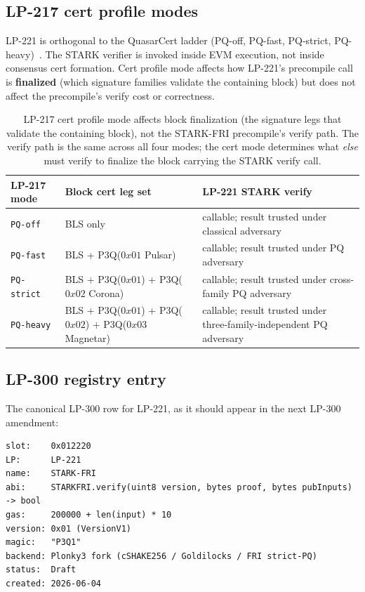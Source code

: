 \subsection{LP-217 cert profile modes}

LP-221 is orthogonal to the QuasarCert ladder (PQ-off, PQ-fast,
PQ-strict, PQ-heavy)~\cite{lp217}. The STARK verifier is invoked
inside EVM execution, not inside consensus cert formation. Cert
profile mode affects how LP-221's precompile call is
\textbf{finalized} (which signature families validate the
containing block) but does not affect the precompile's verify
cost or correctness.

\begin{table}[h]
\centering
\small
\begin{tabular}{@{}p{4.2cm}p{4.5cm}p{4cm}@{}}
\toprule
\textbf{LP-217 mode} & \textbf{Block cert leg set} & \textbf{LP-221 STARK verify} \\
\midrule
\texttt{PQ-off}    & BLS only & callable; result trusted under classical adversary \\
\texttt{PQ-fast}   & BLS + P3Q($0x01$ Pulsar) & callable; result trusted under PQ adversary \\
\texttt{PQ-strict} & BLS + P3Q($0x01$) + P3Q($0x02$ Corona) & callable; result trusted under cross-family PQ adversary \\
\texttt{PQ-heavy}  & BLS + P3Q($0x01$) + P3Q($0x02$) + P3Q($0x03$ Magnetar) & callable; result trusted under three-family-independent PQ adversary \\
\bottomrule
\end{tabular}
\caption{LP-217 cert profile mode affects block finalization (the
signature legs that validate the containing block), not the
STARK-FRI precompile's verify path. The verify path is the same
across all four modes; the cert mode determines what \emph{else}
must verify to finalize the block carrying the STARK verify call.}
\label{tab:cert-modes-starkfri}
\end{table}

\subsection{LP-300 registry entry}

The canonical LP-300 row for LP-221, as it should appear in the
next LP-300 amendment:

\begin{verbatim}
slot:    0x012220
LP:      LP-221
name:    STARK-FRI
abi:     STARKFRI.verify(uint8 version, bytes proof, bytes pubInputs) -> bool
gas:     200000 + len(input) * 10
version: 0x01 (VersionV1)
magic:   "P3Q1"
backend: Plonky3 fork (cSHAKE256 / Goldilocks / FRI strict-PQ)
status:  Draft
created: 2026-06-04
\end{verbatim}

